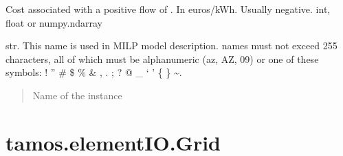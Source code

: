 \documentclass[letterpaper,10pt,english]{sphinxmanual}
\begin{document}
\begin{fulllineitems}
\begin{fulllineitems}
\end{fulllineitems}


\begin{fulllineitems}
\label{\detokenize{generated/tamos.elementIO.Cost:tamos.elementIO.Cost.cost}}
\pysigstartsignatures
{}
\pysigstopsignatures
\sphinxAtStartPar
Cost associated with a positive flow of .
In euros/kWh.
Usually negative.
int, float or numpy.ndarray

\end{fulllineitems}


\begin{fulllineitems}
\label{\detokenize{generated/tamos.elementIO.Cost:tamos.elementIO.Cost.name}}
\pysigstartsignatures
{}
\pysigstopsignatures
\sphinxAtStartPar
str.
This name is used in MILP model description.
names must not exceed 255 characters,
all of which must be alphanumeric (a\sphinxhyphen{}z, A\sphinxhyphen{}Z, 0\sphinxhyphen{}9) or one of these symbols:
! ” \# \$ \% \& , . ; ? @ \_ ‘ ’ \{ \} \textasciitilde{}.
\begin{quote}\begin{description}
\sphinxAtStartPar
Name of the instance

\end{description}\end{quote}

\end{fulllineitems}


\end{fulllineitems}


\sphinxstepscope


\section{tamos.elementIO.Grid}
\label{\detokenize{generated/tamos.elementIO.Grid:tamos-elementio-grid}}\label{\detokenize{generated/tamos.elementIO.Grid::doc}}
\end{document}
